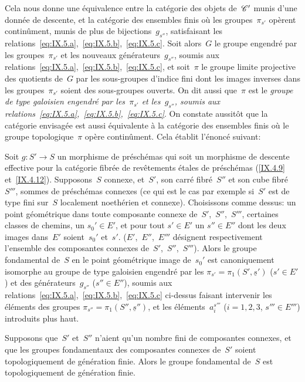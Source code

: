 Cela nous donne une \'equivalence entre la cat\'egorie des objets
de~$\cal{C}'$ munis d'une
donn\'ee de descente, et la cat\'egorie des ensembles finis o\`u
les groupes~$\pi_{s'}$ op\`erent contin\^ument, munis de plus de
bijections~$g_{s''}$, satisfaisant les
relations~\ref{eq:IX.5.a},~\ref{eq:IX.5.b},~\ref{eq:IX.5.c}. Soit
alors~$G$ le groupe engendr\'e par les groupes~$\pi_{s'}$ et les
nouveaux g\'en\'erateurs~$g_{s''}$, soumis aux
relations~\ref{eq:IX.5.a},~\ref{eq:IX.5.b},~\ref{eq:IX.5.c}, et
soit~$\pi$ le groupe limite projective des quotients de~$G$ par les
sous-groupes d'indice fini dont les images inverses dans les
groupes~$\pi_{s'}$ soient des sous-groupes ouverts. On dit aussi
que~$\pi$ est le \emph{groupe de type galoisien engendré par
les~$\pi_{s'}$ et les~$g_{s''}$, soumis aux
relations~\ref{eq:IX.5.a},~\ref{eq:IX.5.b},~\ref{eq:IX.5.c}}. On
constate aussit\^ot que la cat\'egorie envisag\'ee est aussi
\'equivalente \`a la cat\'egorie des ensembles finis o\`u le
groupe topologique~$\pi$ op\`ere contin\^ument. Cela \'etablit
l'\'enonc\'e suivant:
\begin{theoreme}
\label{IX.5.1}
Soit $g\colon S'\to S$ un morphisme de pr\'esch\'emas qui soit un
morphisme de descente effective pour la cat\'egorie fibr\'ee de
rev\^etements \'etales de pr\'esch\'emas (\cf \ref{IX.4.9}
et~\ref{IX.4.12}). Supposons~$S$ connexe, et~$S'$, son carr\'e
fibr\'e~$S''$ et son cube fibr\'e~$S'''$, sommes de
pr\'esch\'emas connexes (ce qui est le cas par exemple si~$S'$ est
de type fini sur~$S$ localement noeth\'erien et connexe).
Choisissons comme dessus: un point g\'eom\'etrique dans toute
composante connexe de~$S'$,~$S''$,~$S'''$, certaines classes de
chemins, un $s_0'\in E'$, et pour tout $s'\in E'$ un
$s''\in E''$
dont les deux images dans~$E'$ soient~$s_0'$ et~$s'$.
($E'$,~$E''$,~$E'''$ d\'esignent respectivement l'ensemble des
composantes connexes de~$S'$,~$S''$,~$S'''$). Alors le groupe
fondamental de~$S$ en le point g\'eom\'etrique image de~$s_0'$ est
canoniquement isomorphe au groupe de type galoisien engendr\'e par
les $\pi_{s'}=\pi_1(S',\underline{s}')$ ($s'\in E'$) et des
g\'en\'erateurs~$g_{s''}$ ($s''\in E''$), soumis aux
relations~\ref{eq:IX.5.a},~\ref{eq:IX.5.b},~\ref{eq:IX.5.c} ci-dessus
faisant intervenir les \'el\'ements des groupes
$\pi_{s''}=\pi_1(S'',\underline{s}'')$, et les
\'el\'ements~$a_i^{s'''}$ ($i=1,2,3$, $s'''\in E'''$) introduits
plus haut.
\end{theoreme}

\begin{corollaire}
\label{IX.5.2}
Supposons que~$S'$ et~$S''$ n'aient qu'un nombre fini de composantes
connexes, et que les groupes fondamentaux des composantes connexes
de~$S'$ soient topologiquement de g\'en\'eration finie. Alors le
groupe fondamental de~$S$ est topologiquement de g\'en\'eration
finie.
\end{corollaire}

